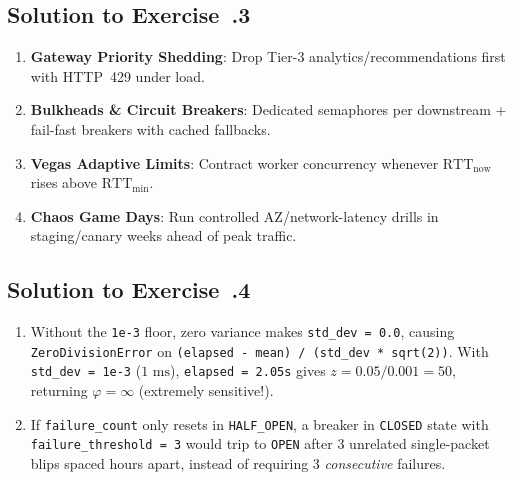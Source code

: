 \subsection*{Solution to Exercise~\thechapter.3}
\begin{figure}[htbp]
\centering
{}
\end{figure}
\begin{enumerate}[leftmargin=18pt]
  \item \textbf{Gateway Priority Shedding}: Drop Tier-3 analytics/recommendations first with HTTP~429 under load.
  \item \textbf{Bulkheads \& Circuit Breakers}: Dedicated semaphores per downstream + fail-fast breakers with cached fallbacks.
  \item \textbf{Vegas Adaptive Limits}: Contract worker concurrency whenever $\text{RTT}_{\text{now}}$ rises above $\text{RTT}_{\min}$.
  \item \textbf{Chaos Game Days}: Run controlled AZ/network-latency drills in staging/canary weeks ahead of peak traffic.
\end{enumerate}

\subsection*{Solution to Exercise~\thechapter.4}
\begin{enumerate}[leftmargin=18pt]
  \item Without the \texttt{1e-3} floor, zero variance makes \texttt{std\_dev = 0.0}, causing \texttt{ZeroDivisionError} on \texttt{(elapsed - mean) / (std\_dev * sqrt(2))}. With \texttt{std\_dev = 1e-3} ($1\text{ ms}$), \texttt{elapsed = 2.05s} gives $z = 0.05 / 0.001 = 50$, returning $\varphi = \infty$ (extremely sensitive!).
  \item If \texttt{failure\_count} only resets in \texttt{HALF\_OPEN}, a breaker in \texttt{CLOSED} state with \texttt{failure\_threshold = 3} would trip to \texttt{OPEN} after 3 unrelated single-packet blips spaced hours apart, instead of requiring 3 \emph{consecutive} failures.
\end{enumerate}

